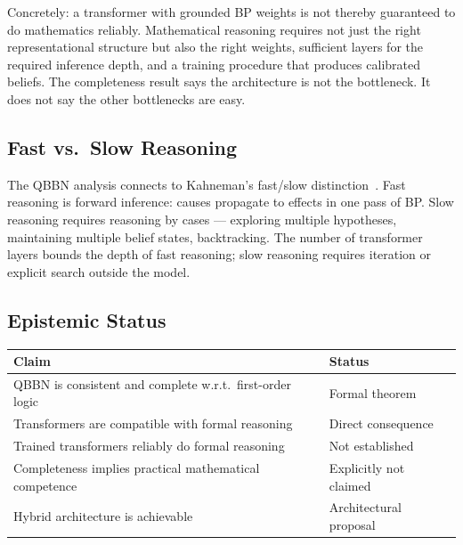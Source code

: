 Concretely: a transformer with grounded BP weights is not thereby guaranteed
to do mathematics reliably. Mathematical reasoning requires not just the
right representational structure but also the right weights, sufficient
layers for the required inference depth, and a training procedure that
produces calibrated beliefs. The completeness result says the architecture
is not the bottleneck. It does not say the other bottlenecks are easy.

\subsection*{Fast vs.\ Slow Reasoning}

The QBBN analysis connects to Kahneman's fast/slow
distinction~\cite{kahneman2011thinking}. Fast reasoning is forward
inference: causes propagate to effects in one pass of BP. Slow reasoning
requires reasoning by cases --- exploring multiple hypotheses, maintaining
multiple belief states, backtracking. The number of transformer layers
bounds the depth of fast reasoning; slow reasoning requires iteration or
explicit search outside the model.

\subsection*{Epistemic Status}

\begin{center}
\begin{tabular}{ll}
\toprule
Claim & Status \\
\midrule
QBBN is consistent and complete w.r.t.\ first-order logic & Formal theorem \\
Transformers are compatible with formal reasoning & Direct consequence \\
Trained transformers reliably do formal reasoning & Not established \\
Completeness implies practical mathematical competence & Explicitly not claimed \\
Hybrid architecture is achievable & Architectural proposal \\
\bottomrule
\end{tabular}
\end{center}